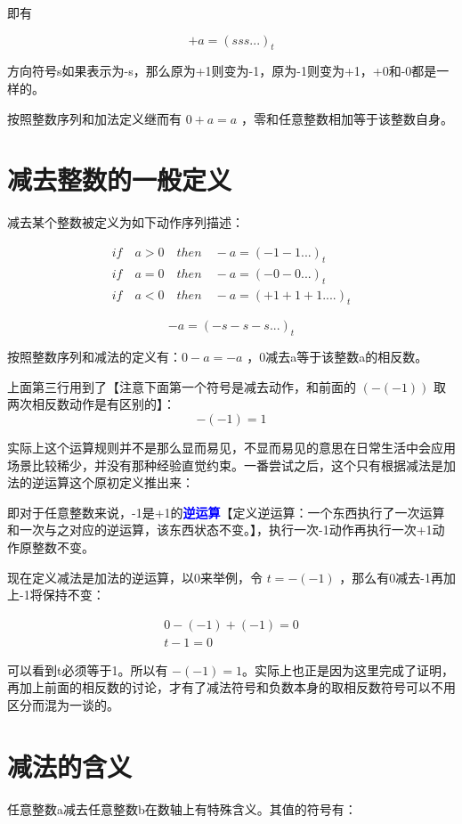 \documentclass[12pt,oneside]{book}
\renewcommand{\emph}[1]{\textcolor{blue}{\textbf{#1}}}
\begin{document}
即有

\[
+a = (sss...)_t
\]

方向符号s如果表示为-s，那么原为+1则变为-1，原为-1则变为+1，+0和-0都是一样的。

按照整数序列和加法定义继而有 $0+a = a$ ，零和任意整数相加等于该整数自身。


\section{减去整数的一般定义}
减去某个整数被定义为如下动作序列描述：

\begin{align}
if \quad a>0 \quad then \quad -a=(-1-1...)_t\\
if \quad a=0 \quad then \quad -a=(-0-0...)_t\\
if \quad a<0 \quad then \quad -a=(+1+1+1....)_t
\end{align}

\[
-a = (-s-s-s...)_t
\]

按照整数序列和减法的定义有：$0-a=-a$  ，0减去a等于该整数a的相反数。

上面第三行用到了【注意下面第一个符号是减去动作，和前面的 $(-(-1))$ 取两次相反数动作是有区别的】：
\begin{equation}
-(-1) = 1
\end{equation}

实际上这个运算规则并不是那么显而易见，不显而易见的意思在日常生活中会应用场景比较稀少，并没有那种经验直觉约束。一番尝试之后，这个只有根据减法是加法的逆运算这个原初定义推出来：

即对于任意整数来说，-1是+1的\emph{逆运算}【定义逆运算：一个东西执行了一次运算和一次与之对应的逆运算，该东西状态不变。】，执行一次-1动作再执行一次+1动作原整数不变。

现在定义减法是加法的逆运算，以0来举例，令 $t=-(-1)$ ，那么有0减去-1再加上-1将保持不变：

\begin{align*}
0-(-1)+(-1)=0\\
t-1=0
\end{align*}

可以看到t必须等于1。所以有 $-(-1) = 1$。实际上也正是因为这里完成了证明，再加上前面的相反数的讨论，才有了减法符号和负数本身的取相反数符号可以不用区分而混为一谈的。

\section{减法的含义}
任意整数a减去任意整数b在数轴上有特殊含义。其值的符号有：
\end{document}
